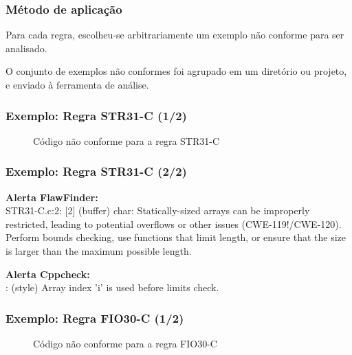 \documentclass{beamer}
\begin{document}
\begin{frame}
  \frametitle{Método de aplicação}

  \begin{minipage}{0.5\textwidth}\centering
    Para cada regra, escolheu-se arbitrariamente um exemplo não conforme para ser analisado.\\\bigskip

  O conjunto de exemplos não conformes foi agrupado em um diretório ou projeto, e enviado à ferramenta de análise.
  \end{minipage}
  \hfill
  \begin{minipage}{0.4\textwidth}\raggedright

  \end{minipage}
\end{frame}

\begin{frame}
  \frametitle{Exemplo: Regra STR31-C (1/2)}
  \begin{figure}[h!]
    \centering
    
    \caption{Código não conforme para a regra STR31-C}
  \label{fig:STR31-C}
  \end{figure}
\end{frame}

\begin{frame}
  \frametitle{Exemplo: Regra STR31-C (2/2)}
  \textbf{\Large Alerta FlawFinder:}\\\medskip
  STR31-C.c:2:  [2] (buffer) char:
  Statically-sized arrays can be improperly restricted, leading to potential overflows or other issues (CWE-119!/CWE-120). Perform bounds checking, use functions that limit length, or ensure that the size is larger than the maximum possible length.\\\bigskip

  \textbf{\Large Alerta Cppcheck:}\\\medskip
  [STR31-C.c:5]: (style) Array index 'i' is used before limits check.

\end{frame}


\begin{frame}
  \frametitle{Exemplo: Regra FIO30-C (1/2)}
  \vspace{-4mm}
  \begin{figure}[h!]
    \centering
    
    \caption{Código não conforme para a regra FIO30-C}
  \label{fig:FIO30-C}
  \end{figure}
\end{frame}
\end{document}
